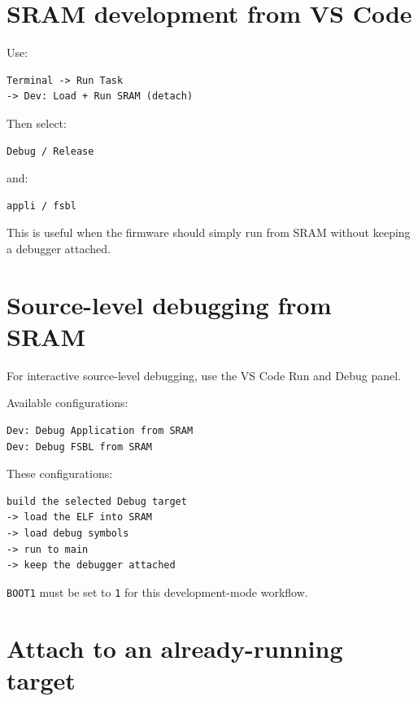 \documentclass[10pt,a4paper,oneside]{report}
\begin{document}
\section{SRAM development from VS Code}\label{wiki-getting-started-build-flash-debug--8-sram-development-from-vs-code}

Use:

\begin{verbatim}
Terminal -> Run Task
-> Dev: Load + Run SRAM (detach)
\end{verbatim}

Then select:

\begin{verbatim}
Debug / Release
\end{verbatim}

and:

\begin{verbatim}
appli / fsbl
\end{verbatim}

This is useful when the firmware should simply run from SRAM without keeping a debugger attached.

\section{Source-level debugging from SRAM}\label{wiki-getting-started-build-flash-debug--9-source-level-debugging-from-sram}

For interactive source-level debugging, use the VS Code Run and Debug panel.

Available configurations:

\begin{verbatim}
Dev: Debug Application from SRAM
Dev: Debug FSBL from SRAM
\end{verbatim}

These configurations:

\begin{verbatim}
build the selected Debug target
-> load the ELF into SRAM
-> load debug symbols
-> run to main
-> keep the debugger attached
\end{verbatim}

\texttt{BOOT1} must be set to \texttt{1} for this development-mode workflow.

\section{Attach to an already-running target}\label{wiki-getting-started-build-flash-debug--10-attach-to-an-already-running-target}
\end{document}
